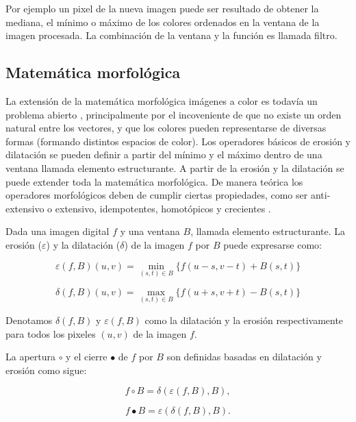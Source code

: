 Por ejemplo un pixel de la nueva imagen puede ser resultado de obtener la mediana, el m\'inimo o m\'aximo de los colores ordenados en la ventana de la imagen procesada.  
La combinaci\'on de la ventana y la funci\'on es llamada filtro. 

 \subsection{Matem\'atica morfol\'ogica}

La extensi\'on de la matem\'atica morfol\'ogica imágenes a color es todav\'ia un problema abierto \cite{aptoula2007pseudo}, principalmente por el incoveniente de que no existe un orden natural entre los vectores, y que los colores pueden representarse de diversas formas (formando distintos espacios de color). Los operadores b\'asicos de erosi\'on y dilataci\'on se pueden definir a partir del m\'inimo y el m\'aximo dentro de una ventana llamada elemento estructurante. A partir de la erosi\'on y la dilataci\'on se puede extender toda la matem\'atica morfol\'ogica. De manera te\'orica los operadores morfol\'ogicos deben de cumplir ciertas propiedades, como ser anti-extensivo o extensivo, idempotentes, homot\'opicos y crecientes \cite{serra1986introduction}.

Dada una imagen digital $f$ y una ventana $B$, llamada elemento estructurante. La erosi\'on ($\varepsilon$) y la dilataci\'on ($\delta$) de la imagen $f$ por $B$ puede expresarse como:

\begin{equation}
\varepsilon(f,B)(u,v)  = \min_{(s,t) \in B} \{f(u-s,v-t) + B(s,t) \}
\end{equation}

\begin{equation}
\delta(f,B)(u,v)  =  \max_{(s,t) \in B} \{f(u+s,v+t) - B(s,t) \}
\end{equation}

Denotamos $\delta(f,B)$ y $\varepsilon(f,B)$ como la dilataci\'on y la erosi\'on respectivamente para todos los pixeles $(u,v)$ de la imagen $f$.

La apertura $\circ$ y el cierre $\bullet$ de $f$ por $B$ son definidas basadas en dilataci\'on y erosi\'on como sigue:

\begin{equation}
f\circ B = \delta(\varepsilon(f,B),B),
\end{equation}

\begin{equation}
f\bullet B = \varepsilon(\delta(f,B),B).
\end{equation}

